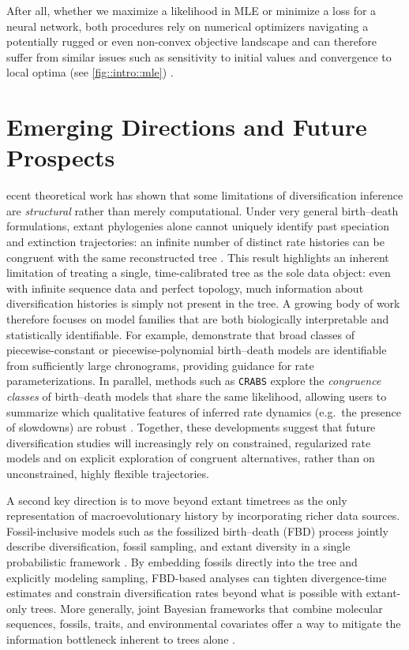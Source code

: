 After all, whether we maximize a likelihood in MLE or minimize a loss for a neural network, both procedures rely on numerical optimizers navigating a potentially rugged or even non-convex objective landscape and can therefore suffer from similar issues such as sensitivity to initial values and convergence to local optima (see \autoref{fig::intro::mle}) \citep{dauphin_identifying_2014,choromanska_loss_2015}.



\clearpage
\section{Emerging Directions and Future Prospects}
ecent theoretical work has shown that some limitations of diversification inference are \emph{structural} rather than merely computational. Under very general birth--death formulations, extant phylogenies alone cannot uniquely identify past speciation and extinction trajectories: an infinite number of distinct rate histories can be congruent with the same reconstructed tree \citep{louca_extant_2020}. This result highlights an inherent limitation of treating a single, time-calibrated tree as the sole data object: even with infinite sequence data and perfect topology, much information about diversification histories is simply not present in the tree. A growing body of work therefore focuses on model families that are both biologically interpretable and statistically identifiable. For example, \citet{legried_class_2022,legried_identifiability_2023} demonstrate that broad classes of piecewise-constant or piecewise-polynomial birth--death models are identifiable from sufficiently large chronograms, providing guidance for rate parameterizations. In parallel, methods such as \texttt{CRABS} explore the \emph{congruence classes} of birth--death models that share the same likelihood, allowing users to summarize which qualitative features of inferred rate dynamics (e.g.\ the presence of slowdowns) are robust \citep{hohna_crabs_2022}. Together, these developments suggest that future diversification studies will increasingly rely on constrained, regularized rate models and on explicit exploration of congruent alternatives, rather than on unconstrained, highly flexible trajectories.

A second key direction is to move beyond extant timetrees as the only representation of macroevolutionary history by incorporating richer data sources. Fossil-inclusive models such as the fossilized birth--death (FBD) process jointly describe diversification, fossil sampling, and extant diversity in a single probabilistic framework \citep{heath_fossilized_2014}. By embedding fossils directly into the tree and explicitly modeling sampling, FBD-based analyses can tighten divergence-time estimates and constrain diversification rates beyond what is possible with extant-only trees. More generally, joint Bayesian frameworks that combine molecular sequences, fossils, traits, and environmental covariates offer a way to mitigate the information bottleneck inherent to trees alone \citep{silvestro_bayesian_2011,zhang_total-evidence_2016,hauffe_trait-mediated_2024,magee_locally_2020,wu_rapid_2023}. 

